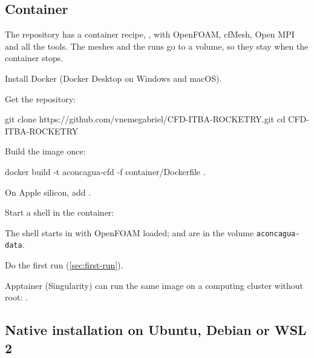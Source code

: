 \subsection{Container}\label{sec:install-container}

The repository has a container recipe, , with OpenFOAM,
cfMesh, Open MPI and all the tools. The meshes and the runs go to a volume, so they stay
when the container stops.

\begin{steps}
\item Install Docker (Docker Desktop on Windows and macOS).
\item Get the repository:
\begin{shell}
git clone https://github.com/vnemegabriel/CFD-ITBA-ROCKETRY.git
cd CFD-ITBA-ROCKETRY
\end{shell}
\item Build the image once:
\begin{shell}
docker build -t aconcagua-cfd -f container/Dockerfile .
\end{shell}
  On Apple silicon, add .
\item Start a shell in the container:
  The shell starts in  with OpenFOAM loaded;
   and  are in the volume \texttt{aconcagua-data}.
\item Do the first run (\cref{sec:first-run}).
\end{steps}

\begin{note}
Apptainer (Singularity) can run the same image on a computing cluster without root:
.
\end{note}

\subsection{Native installation on Ubuntu, Debian or WSL 2}\label{sec:install-native}

